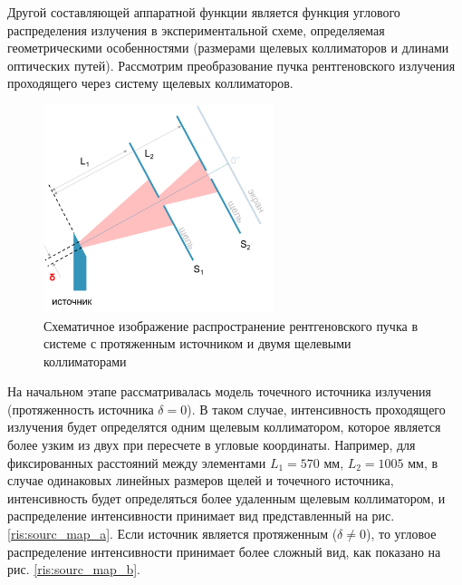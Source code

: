 \label{sec:slits_section}
Другой составляющей аппаратной функции является функция углового распределения излучения в
экспериментальной схеме, определяемая геометрическими особенностями (размерами щелевых
коллиматоров и длинами оптических путей). Рассмотрим преобразование пучка рентгеновского
 излучения проходящего через систему щелевых коллиматоров.
\begin{figure}[H]
  \centering
  \includegraphics[width=0.6\textwidth]{images/for_slits.png}
  \caption{Схематичное изображение распространение рентгеновского пучка в
  системе с протяженным источником и двумя щелевыми коллиматорами}
  \label{ris:for_slits}
\end{figure}

На начальном этапе рассматривалась модель точечного источника излучения
 (протяженность источника $\delta = 0$).
В таком случае, интенсивность проходящего излучения будет определятся
одним щелевым коллиматором, которое является более узким из двух при пересчете в угловые
координаты. Например, для фиксированных расстояний между элементами $L_1 = 570$ мм, $L_2 = 1005$ мм,
 в случае одинаковых линейных размеров щелей и точечного
источника, интенсивность будет определяться более удаленным щелевым коллиматором, и
распределение интенсивности принимает вид представленный на рис. \ref{ris:sourc_map_a}. Если источник является
протяженным ($\delta \neq 0$), то угловое распределение интенсивности принимает более сложный вид,
 как показано на рис. \ref{ris:sourc_map_b}.


